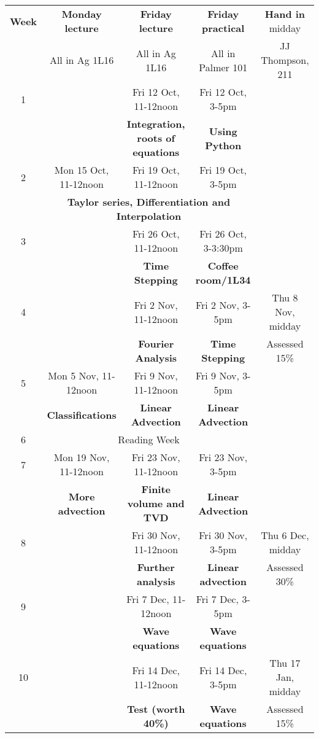 {\footnotesize
\setlength{\tabcolsep}{6pt}
\renewcommand{\arraystretch}{1.3}
\begin{tabular}{c|c|c|c|c}
\bf Week & \bf Monday lecture & \bf Friday lecture & \bf Friday practical & {\bf Hand in} midday\\
         &   All in Ag 1L16   &  All in Ag 1L16    & All in Palmer 101 & JJ Thompson, 211\\
\hline
1 &  & Fri 12 Oct, 11-12noon & Fri 12 Oct, 3-5pm \\
  &  & \bf Integration, roots of equations & \bf Using Python \\
\hline
2 & Mon 15 Oct, 11-12noon & Fri 19 Oct, 11-12noon & Fri 19 Oct, 3-5pm\\
  & \multicolumn{3}{c|}{\bf Taylor series, Differentiation and Interpolation}& \\
\hline
3 &  & Fri 26 Oct, 11-12noon & Fri 26 Oct, 3-3:30pm \\
  &  & \bf Time Stepping & \bf Coffee room/1L34 \\
\hline
4 &  & Fri 2 Nov, 11-12noon & Fri 2 Nov, 3-5pm & Thu 8 Nov, midday \\
  &  & \bf Fourier Analysis & \bf Time Stepping & Assessed 15\% \\
\hline
5 & Mon 5 Nov, 11-12noon & Fri 9 Nov, 11-12noon & Fri 9 Nov, 3-5pm\\
  & \bf Classifications & \bf Linear Advection & \bf Linear Advection \\
\hline
6 & \multicolumn{3}{c}{Reading Week} \\
\hline
7 & Mon 19 Nov, 11-12noon & Fri 23 Nov, 11-12noon & Fri 23 Nov, 3-5pm\\
  & \bf More advection & \bf Finite volume and TVD & \bf Linear Advection \\
\hline
8 &  & Fri 30 Nov, 11-12noon & Fri 30 Nov, 3-5pm  & Thu 6 Dec, midday\\
  &  & \bf Further analysis & \bf Linear advection & Assessed 30\% \\
\hline
9 &  & Fri 7 Dec, 11-12noon & Fri 7 Dec, 3-5pm \\
  &  & \bf Wave equations & \bf Wave equations \\
\hline
10 &  & Fri 14 Dec, 11-12noon & Fri 14 Dec, 3-5pm & Thu 17 Jan, midday \\
  &  & \bf Test (worth 40\%) & \bf Wave equations & Assessed 15\%\\
\hline

\end{tabular}
}

